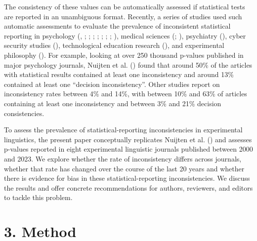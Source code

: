 \documentclass[
  doc,
  longtable,
  nolmodern,
  notxfonts,
  notimes,
  colorlinks=true,linkcolor=blue,citecolor=blue,urlcolor=blue]{apa7}
\begin{document}
The consistency of these values can be automatically assessed if
statistical tests are reported in an unambiguous format. Recently, a
series of studies used such automatic assessments to evaluate the
prevalence of inconsistent statistical reporting in psychology
(,
;
;
;
;
;
;
;
), medical
sciences (; ),
psychiatry (), cyber security studies (), technological education research
(), and
experimental philosophy (). For example, looking at over 250 thousand p-values
published in major psychology journals, Nuijten et al.
() found that around 50\% of
the articles with statistical results contained at least one
inconsistency and around 13\% contained at least one ``decision
inconsistency''. Other studies report on inconsistency rates between 4\%
and 14\%, with between 10\% and 63\% of articles containing at least one
inconsistency and between 3\% and 21\% decision consistencies.

To assess the prevalence of statistical-reporting inconsistencies in
experimental linguistics, the present paper conceptually replicates
Nuijten et al. () and assesses
p-values reported in eight experimental linguistic journals published
between 2000 and 2023. We explore whether the rate of inconsistency
differs across journals, whether that rate has changed over the course
of the last 20 years and whether there is evidence for bias in these
statistical-reporting inconsistencies. We discuss the results and offer
concrete recommendations for authors, reviewers, and editors to tackle
this problem.

\section{3. Method}\label{method}
\end{document}
